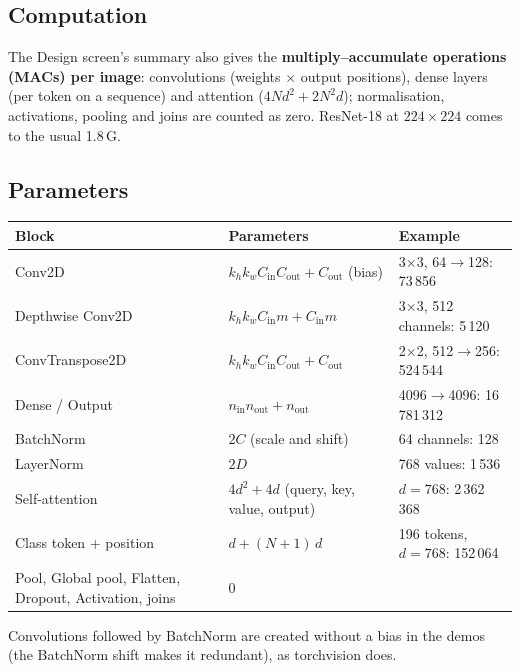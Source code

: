 \documentclass[11pt,a4paper]{article}
\begin{document}
\subsection{Computation}
The Design screen's summary also gives the \textbf{multiply--accumulate operations (MACs) per image}: convolutions (weights $\times$
output positions), dense layers (per token on a sequence) and attention ($4Nd^2 + 2N^2d$); normalisation, activations, pooling and joins
are counted as zero. ResNet-18 at $224\times224$ comes to the usual 1.8\,G.

\subsection{Parameters}
\begin{center}
\begin{tabular}{@{}p{3.9cm}p{6.4cm}p{5cm}@{}}
\toprule
\textbf{Block} & \textbf{Parameters} & \textbf{Example}\\
\midrule
Conv2D & $k_h k_w C_{\text{in}} C_{\text{out}} + C_{\text{out}}$ (bias) & 3$\times$3, 64$\rightarrow$128: 73\,856\\
Depthwise Conv2D & $k_h k_w C_{\text{in}} m + C_{\text{in}} m$ & 3$\times$3, 512 channels: 5\,120\\
ConvTranspose2D & $k_h k_w C_{\text{in}} C_{\text{out}} + C_{\text{out}}$ & 2$\times$2, 512$\rightarrow$256: 524\,544\\
Dense / Output & $n_{\text{in}} n_{\text{out}} + n_{\text{out}}$ & 4096$\rightarrow$4096: 16\,781\,312\\
BatchNorm & $2C$ (scale and shift) & 64 channels: 128\\
LayerNorm & $2D$ & 768 values: 1\,536\\
Self-attention & $4d^2 + 4d$ (query, key, value, output) & $d=768$: 2\,362\,368\\
Class token + position & $d + (N+1)\,d$ & 196 tokens, $d=768$: 152\,064\\
Pool, Global pool, Flatten, Dropout, Activation, joins & 0 & \\
\bottomrule
\end{tabular}
\end{center}
Convolutions followed by BatchNorm are created without a bias in the demos (the BatchNorm shift makes it redundant), as torchvision does.
\end{document}
